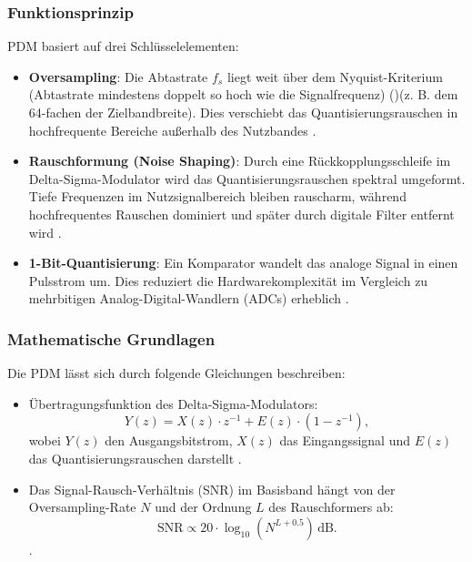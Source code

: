 \subsubsection{Funktionsprinzip}
PDM basiert auf drei Schlüsselelementen:
\begin{itemize}
	\item \textbf{Oversampling}: Die Abtastrate $f_s$ liegt weit über dem Nyquist-Kriterium (Abtastrate mindestens doppelt so hoch wie die Signalfrequenz) (\cite{Görne:2014a})(z. B. dem 64-fachen der Zielbandbreite). Dies verschiebt das Quantisierungsrauschen in hochfrequente Bereiche außerhalb des Nutzbandes \cite{Weinzierl:2008}\cite{Görne:2014b}.
	
	\item \textbf{Rauschformung (Noise Shaping)}: Durch eine Rückkopplungsschleife im Delta-Sigma-Modulator wird das Quantisierungsrauschen spektral umgeformt. Tiefe Frequenzen im Nutzsignalbereich bleiben rauscharm, während hochfrequentes Rauschen dominiert und später durch digitale Filter entfernt wird \cite{Weinzierl:2008}.
	
	\item \textbf{1-Bit-Quantisierung}: Ein Komparator wandelt das analoge Signal in einen Pulsstrom um. Dies reduziert die Hardwarekomplexität im Vergleich zu mehrbitigen Analog-Digital-Wandlern (ADCs) erheblich \cite{Weinzierl:2008}.
\end{itemize}

\subsubsection{Mathematische Grundlagen}
Die PDM lässt sich durch folgende Gleichungen beschreiben:
\begin{itemize}
	\item Übertragungsfunktion des Delta-Sigma-Modulators:
	\begin{equation}
		Y(z) = X(z) \cdot z^{-1} + E(z) \cdot \left(1 - z^{-1}\right),
	\end{equation}
	wobei $Y(z)$ den Ausgangsbitstrom, $X(z)$ das Eingangssignal und $E(z)$ das Quantisierungsrauschen darstellt \cite{Weinzierl:2008}.
	
	\item Das Signal-Rausch-Verhältnis (SNR) im Basisband hängt von der Oversampling-Rate $N$ und der Ordnung $L$ des Rauschformers ab:
	\begin{equation}
		\text{SNR} \propto 20 \cdot \log_{10}\left(N^{L+0.5}\right) \, \text{dB}.
	\end{equation}
	\cite{Weinzierl:2008}.
\end{itemize}

